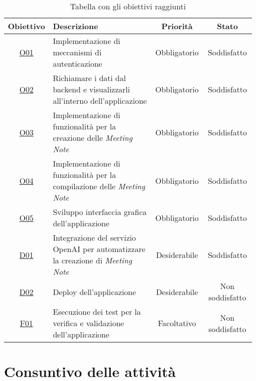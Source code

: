 \begin{table}
    \centering
    \begin{tabularx}{\textwidth}{|c|X|c|c|}
        \hline
        \textbf{Obiettivo} & \textbf{Descrizione} & \textbf{Priorità} & \textbf{Stato} \\ \hline
        \hyperref[O01]{O01} & 
        Implementazione di meccanismi di autenticazione &
        Obbligatorio & 
        Soddisfatto \\ \hline
        \hyperref[O02]{O02} & 
        Richiamare i dati dal backend e visualizzarli all'interno dell'applicazione &
        Obbligatorio & 
        Soddisfatto \\ \hline
        \hyperref[O03]{O03} & 
        Implementazione di funzionalità per la creazione delle \textit{Meeting Note} &
        Obbligatorio & 
        Soddisfatto \\ \hline
        \hyperref[O04]{O04} & 
        Implementazione di funzionalità per la compilazione delle \textit{Meeting Note} &
        Obbligatorio & 
        Soddisfatto \\ \hline
        \hyperref[O05]{O05} & 
        Sviluppo interfaccia grafica dell'applicazione &
        Obbligatorio & 
        Soddisfatto \\ \hline
        \hyperref[D01]{D01} & 
        Integrazione del servizio OpenAI per automatizzare la creazione di \textit{Meeting Note} &
        Desiderabile & 
        Soddisfatto \\ \hline
        \hyperref[D02]{D02} & 
        Deploy dell'applicazione &
        Desiderabile & 
        Non soddisfatto \\ \hline
        \hyperref[F01]{F01} & 
        Esecuzione dei test per la verifica e validazione dell'applicazione &
        Facoltativo & 
        Non soddisfatto \\ \hline
    \end{tabularx}%
\caption{Tabella con gli obiettivi raggiunti}
\label{tab:obbiettivi-raggiunti}
\end{table}

\section{Consuntivo delle attività}
\label{sec:consultivo-attivita}


